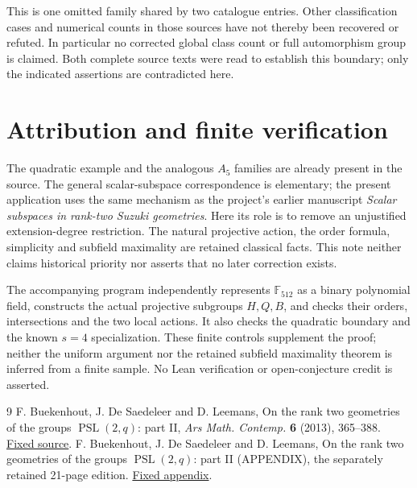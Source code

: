 \documentclass[11pt]{article}
\newcommand{\F}{\mathbb F}
\newcommand{\PS}{\operatorname{PSL}}
\begin{document}
This is one omitted family shared by two catalogue entries. Other
classification cases and numerical counts in those sources have not
thereby been recovered or refuted. In particular no corrected global
class count or full automorphism group is claimed. Both complete source
texts were read to establish this boundary; only the indicated assertions
are contradicted here.

\section{Attribution and finite verification}
The quadratic example and the analogous $A_5$ families are already present
in the source. The general scalar-subspace correspondence is elementary;
the present application uses the same mechanism as the project's earlier
manuscript \emph{Scalar subspaces in rank-two Suzuki geometries}.
Here its role is to remove an unjustified extension-degree restriction.
The natural projective action, the order formula, simplicity and subfield
maximality are retained classical facts. This note neither claims
historical priority nor asserts that no later correction exists.

The accompanying program independently represents $\F_{512}$ as a binary
polynomial field, constructs the actual projective subgroups $H,Q,B$,
and checks their orders, intersections and the two local actions.
It also checks the quadratic boundary and the known $s=4$ specialization.
These finite controls supplement the proof; neither the uniform argument
nor the retained subfield maximality theorem is inferred from a finite
sample. No Lean verification or open-conjecture credit is asserted.

\begin{thebibliography}{9}
 F. Buekenhout, J. De Saedeleer and D. Leemans,
On the rank two geometries of the groups $\PS(2,q)$: part II,
\emph{Ars Math. Contemp.} \textbf{6} (2013), 365--388.
\href{https://amc-journal.eu/index.php/amc/article/download/181/241}{Fixed source}.
 F. Buekenhout, J. De Saedeleer and D. Leemans,
On the rank two geometries of the groups $\PS(2,q)$: part II (APPENDIX),
the separately retained 21-page edition.
\href{https://amc-journal.eu/index.php/amc/article/download/181/1862}{Fixed appendix}.
\end{thebibliography}
\end{document}
